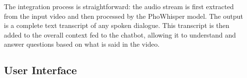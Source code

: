 The integration process is straightforward: the audio stream is first extracted from the input video and then processed by the PhoWhisper model. The output is a complete text transcript of any spoken dialogue. This transcript is then added to the overall context fed to the chatbot, allowing it to understand and answer questions based on what is said in the video.


\subsection{User Interface}

